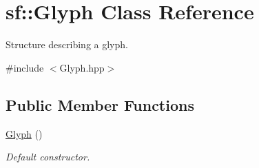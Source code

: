 \hypertarget{classsf_1_1_glyph}{\section{sf\+:\+:Glyph Class Reference}
\label{classsf_1_1_glyph}
}


Structure describing a glyph.  




{\ttfamily \#include $<$Glyph.\+hpp$>$}

\subsection*{Public Member Functions}
\begin{DoxyCompactItemize}
\item 
\hypertarget{classsf_1_1_glyph_ab15cfc37eb7b40a94b3b3aedf934010b}{\hyperlink{classsf_1_1_glyph_ab15cfc37eb7b40a94b3b3aedf934010b}{Glyph} ()}\label{classsf_1_1_glyph_ab15cfc37eb7b40a94b3b3aedf934010b}

\begin{DoxyCompactList}\small\item\em Default constructor. \end{DoxyCompactList}\end{DoxyCompactItemize}
